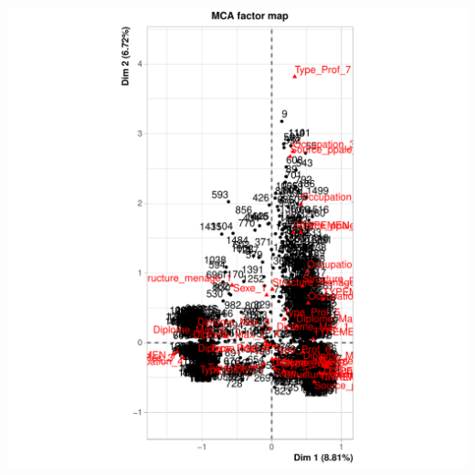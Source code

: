 \documentclass[11pt,a4paper, x11names]{article}\usepackage[]{graphicx}\usepackage[]{color}
\makeatletter
\def\maxwidth{ %
  \ifdim\Gin@nat@width>\linewidth
    \linewidth
  \else
    \Gin@nat@width
  \fi
}
\newenvironment{knitrout}{}{} %
\makeatother
\begin{document}
\begin{knitrout}
\includegraphics[width=\maxwidth]{figure/unnamed-chunk-13-5} 
\end{knitrout}
\end{document}
